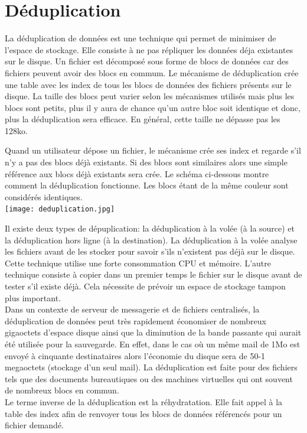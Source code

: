 \documentclass[a4paper]{report}
\begin{document}
	\chapter*{Déduplication}
	La déduplication de données est une technique qui permet de minimiser de l'espace de stockage. Elle consiste à ne pas répliquer les données déja existantes sur le disque. Un fichier est décomposé sous forme de blocs de données car des fichiers peuvent avoir des blocs en commum. Le mécanisme de déduplication crée une table avec les index de tous les blocs de données des fichiers présents sur le disque. La taille des blocs peut varier selon les mécanismes utilisés mais plus les blocs sont petits, plus il y aura de chance qu'un autre bloc soit identique et donc, plus la déduplication sera efficace. En général, cette taille ne dépasse pas les 128ko.
 
 Quand un utilisateur dépose un fichier, le mécanisme crée ses index et regarde s'il n'y a pas des blocs déjà existants. Si des blocs sont similaires alors une simple référence aux blocs déjà existants sera crée. Le schéma ci-dessous montre comment la déduplication fonctionne. Les blocs étant de la même couleur sont considérés identiques.\\
\texttt{[image: deduplication.jpg]}

Il existe deux types de dépuplication: la déduplication à la volée (à la source) et la déduplication hors ligne (à la destination). La déduplication à la volée analyse les fichiers avant de les stocker pour savoir s'ils n'existent pas déjà sur le disque. Cette technique utilise une forte consommation CPU et mémoire. L'autre technique consiste à copier dans un premier temps le fichier sur le disque avant de tester s'il existe déjà. Cela nécessite de prévoir un espace de stockage tampon plus important. \\

Dans un contexte de serveur de messagerie et de fichiers centralisés, la déduplication de données peut très rapidement économiser de nombreux gigaoctets d'espace disque ainsi que la diminution de la bande passante qui aurait été utilisée pour la sauvegarde. En effet, dans le cas où un même mail de 1Mo est envoyé à cinquante destinataires alors l'économie du disque sera de 50-1 megaoctets (stockage d'un seul mail). La déduplication est faite pour des fichiers tels que des documents bureautiques ou des machines virtuelles qui ont souvent de nombreux blocs en commun.\\
Le terme inverse de la déduplication est la réhydratation. Elle fait appel à la table des index afin de renvoyer tous les blocs de données référencés pour un fichier demandé.\\
\end{document}
